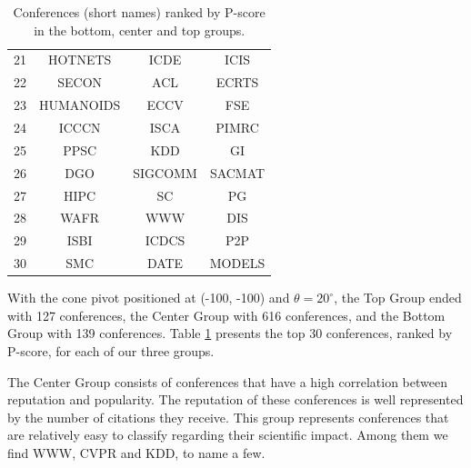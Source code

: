 \documentclass[man]{apa6}
\begin{document}
\begin{table}[h!]
\begin{tabular}{c c c c}
  21 & HOTNETS   & ICDE        & ICIS      \\
  22 & SECON     & ACL         & ECRTS     \\
  23 & HUMANOIDS & ECCV        & FSE       \\
  24 & ICCCN     & ISCA        & PIMRC     \\
  25 & PPSC      & KDD         & GI        \\
  26 & DGO       & SIGCOMM     & SACMAT    \\
  27 & HIPC      & SC          & PG        \\
  28 & WAFR      & WWW         & DIS       \\
  29 & ISBI      & ICDCS       & P2P       \\
  30 & SMC       & DATE        & MODELS    \\
  \bottomrule
  \end{tabular}
  \caption{Conferences (short names) ranked by P-score in the bottom, center and top groups.}
  \label{tab:conferences}
\end{table}

With the cone pivot positioned at (-100, -100) and $ \theta=20^{\circ} $, the Top Group ended with 127 conferences, the 
Center Group with 616 conferences, and the Bottom Group with 139 conferences. Table 
\ref{tab:conferences} presents the top 30 conferences, ranked by P-score, for each of our three groups.

The Center Group consists of conferences that have a high correlation between reputation and
popularity. The reputation of these conferences is well represented by the number of citations
they receive. This group represents conferences that are relatively easy to classify regarding
their scientific impact. Among them we find WWW, CVPR and KDD, to name a few.
\end{document}
